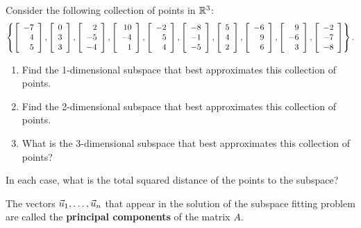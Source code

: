 \documentclass{ximera}
\begin{document}
\begin{example}\label{ex:subspace-fitting-r3}
  Consider the following collection of points in $\R^3$:
  \begin{equation*}
    \set{
      \startmat{r} -7 \\ 4 \\ 5 \stopmat,
      \startmat{r} 0 \\ 3 \\ 3 \stopmat,
      \startmat{r} 2 \\ -5 \\ -4 \stopmat,
      \startmat{r} 10 \\ -4 \\ 1 \stopmat,
      \startmat{r} -2 \\ 5 \\ 4 \stopmat,
      \startmat{r} -8 \\ -1 \\ -5 \stopmat,
      \startmat{r} 5 \\ 4 \\ 2 \stopmat,
      \startmat{r} -6 \\ 9 \\ 6 \stopmat,
      \startmat{r} 9 \\ -6 \\ 3 \stopmat,
      \startmat{r} -2 \\ -7 \\ -8 \stopmat
    }.
  \end{equation*}
    \begin{enumerate}
    \item Find the 1-dimensional subspace that best approximates this
      collection of points.
    \item Find the 2-dimensional subspace that best approximates this
      collection of points.
    \item What is the 3-dimensional subspace that best approximates this
      collection of points?
    \end{enumerate}
  In each case, what is the total squared distance of the points to
  the subspace?
\end{example}

The vectors $\vect{u}_1,\ldots,\vect{u}_n$ that appear in the solution
of the subspace fitting problem are called the \textbf{principal
  components} of the matrix $A$.
\end{document}
